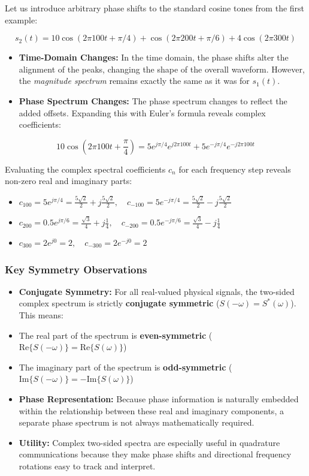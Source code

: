 \documentclass[
]{article}
\providecommand{\tightlist}{%
  \setlength{\itemsep}{0pt}\setlength{\parskip}{0pt}}
\begin{document}
Let us introduce arbitrary phase shifts to the standard cosine tones
from the first example:

\[s_2(t) = 10\cos(2\pi 100t + \pi/4) + \cos(2\pi 200t + \pi/6) + 4\cos(2\pi 300t)\]

\begin{itemize}
\tightlist
\item
  \textbf{Time-Domain Changes:} In the time domain, the phase shifts
  alter the alignment of the peaks, changing the shape of the overall
  waveform. However, the \emph{magnitude spectrum} remains exactly the
  same as it was for \(s_1(t)\).
\item
  \textbf{Phase Spectrum Changes:} The phase spectrum changes to reflect
  the added offsets. Expanding this with Euler's formula reveals complex
  coefficients:
\end{itemize}

\[10\cos\left(2\pi 100t + \frac{\pi}{4}\right) = 5e^{j\pi/4}e^{j2\pi 100t} + 5e^{-j\pi/4}e^{-j2\pi 100t}\]

Evaluating the complex spectral coefficients \(c_n\) for each frequency
step reveals non-zero real and imaginary parts:

\begin{itemize}
\tightlist
\item
  \(c_{100} = 5e^{j\pi/4} = \frac{5\sqrt{2}}{2} + j\frac{5\sqrt{2}}{2}, \quad c_{-100} = 5e^{-j\pi/4} = \frac{5\sqrt{2}}{2} - j\frac{5\sqrt{2}}{2}\)
\item
  \(c_{200} = 0.5e^{j\pi/6} = \frac{\sqrt{3}}{4} + j\frac{1}{4}, \quad c_{-200} = 0.5e^{-j\pi/6} = \frac{\sqrt{3}}{4} - j\frac{1}{4}\)
\item
  \(c_{300} = 2e^{j0} = 2, \quad c_{-300} = 2e^{-j0} = 2\)
\end{itemize}

\subsubsection{Key Symmetry
Observations}\label{key-symmetry-observations}

\begin{itemize}
\item
  \textbf{Conjugate Symmetry:} For all real-valued physical signals, the
  two-sided complex spectrum is strictly \textbf{conjugate symmetric}
  (\(S(-\omega) = S^*(\omega)\)). This means:
\item
  The real part of the spectrum is \textbf{even-symmetric}
  (\(\text{Re}\{S(-\omega)\} = \text{Re}\{S(\omega)\}\))
\item
  The imaginary part of the spectrum is \textbf{odd-symmetric}
  (\(\text{Im}\{S(-\omega)\} = -\text{Im}\{S(\omega)\}\))
\item
  \textbf{Phase Representation:} Because phase information is naturally
  embedded within the relationship between these real and imaginary
  components, a separate phase spectrum is not always mathematically
  required.
\item
  \textbf{Utility:} Complex two-sided spectra are especially useful in
  quadrature communications because they make phase shifts and
  directional frequency rotations easy to track and interpret.
\end{itemize}
\end{document}
